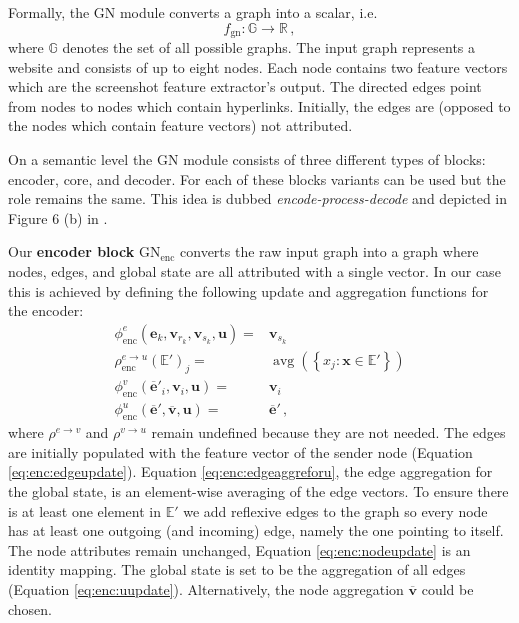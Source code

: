 Formally, the GN module converts a graph into a scalar, i.e. \begin{equation}
    \label{eq:gnmodule}
    f_\text{gn}:\mathbb{G}\rightarrow\mathbb{R}\,,
\end{equation} where $\mathbb{G}$ denotes the set of all possible graphs. The input graph represents a website and consists of up to eight nodes. Each node contains two feature vectors which are the screenshot feature extractor's output. The directed edges point from nodes to nodes which contain hyperlinks. Initially, the edges are (opposed to the nodes which contain feature vectors) not attributed.

On a semantic level the GN module consists of three different types of blocks: encoder, core, and decoder. For each of these blocks variants can be used but the role remains the same. This idea is dubbed \textit{encode-process-decode} and depicted in Figure 6 (b) in \cite{deepmind:graphnets}.

Our \textbf{encoder block} $\text{GN}_\text{enc}$ converts the raw input graph into a graph where nodes, edges, and global state are all attributed with a single vector. In our case this is achieved by defining the following update and aggregation functions for the encoder:\begin{align}
    \phi^e_\text{enc}\left(\bm{e}_k,\bm{v}_{r_k},\bm{v}_{s_k},\bm{u}\right)=&\bm{v}_{s_k}\label{eq:enc:edgeupdate}\\
    \rho^{e\rightarrow u}_\text{enc}\left(\mathbb{E}'\right)_j=&\operatorname{avg}\left(\left\{x_j:\bm{x}\in\mathbb{E}'\right\}\right)\label{eq:enc:edgeaggreforu}\\
    \phi^v_\text{enc}\left(\bm{\overline{e}}'_i,\bm{v}_i,\bm{u}\right)=&\bm{v}_i\label{eq:enc:nodeupdate}\\
    \phi^u_\text{enc}\left(\bm{\overline{e}}',\bm{\overline{v}},\bm{u}\right)=&\bm{\overline{e}}'\label{eq:enc:uupdate}\,,
\end{align}where $\rho^{e\rightarrow v}$ and $\rho^{v\rightarrow u}$ remain undefined because they are not needed. The edges are initially populated with the feature vector of the sender node (Equation \ref{eq:enc:edgeupdate}). Equation \ref{eq:enc:edgeaggreforu}, the edge aggregation for the global state, is an element-wise averaging of the edge vectors. To ensure there is at least one element in $\mathbb{E}'$ we add reflexive edges to the graph so every node has at least one outgoing (and incoming) edge, namely the one pointing to itself. The node attributes remain unchanged, Equation \ref{eq:enc:nodeupdate} is an identity mapping. The global state is set to be the aggregation of all edges (Equation \ref{eq:enc:uupdate}). Alternatively, the node aggregation $\bm{\overline{v}}$ could be chosen.

